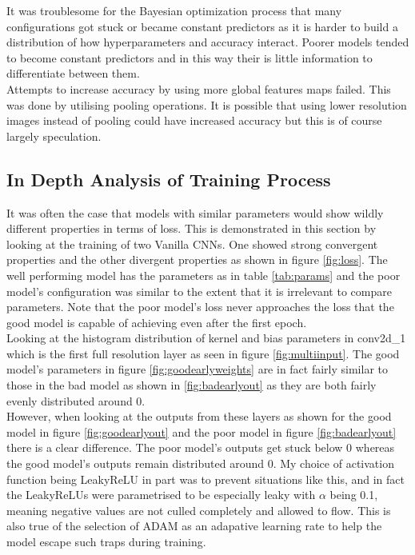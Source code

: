 \documentclass{article}
\begin{document}
{It was troublesome for the Bayesian optimization process that many configurations got stuck or became constant predictors as it is harder to build a distribution of how hyperparameters and accuracy interact. Poorer models tended to become constant predictors and in this way their is little information to differentiate between them. \\

Attempts to increase accuracy by using more global features maps failed. This was done by utilising pooling operations. It is possible that using lower resolution images instead of pooling could have increased accuracy but this is of course largely speculation. \\


\subsection{In Depth Analysis of Training Process}
It was often the case that models with similar parameters would show wildly different properties in terms of loss. This is demonstrated in this section by looking at the training of two Vanilla CNNs. One showed strong convergent properties and the other divergent properties as shown in figure \ref{fig:loss}. The well performing model has the parameters as in table \ref{tab:params} and the poor model's configuration was similar to the extent that it is irrelevant to compare parameters. Note that the poor model's loss never approaches the loss that the good model is capable of achieving even after the first epoch.\\

Looking at the histogram distribution of kernel and bias parameters in conv2d\_1 which is the first full resolution layer as seen in figure \ref{fig:multiinput}. The good model's parameters in figure \ref{fig:goodearlyweights} are in fact fairly similar to those in the bad model as shown in \ref{fig:badearlyout} as they are both fairly evenly distributed around 0. \\

However, when looking at the outputs from these layers as shown for the good model in figure \ref{fig:goodearlyout} and the poor model in figure \ref{fig:badearlyout} there is a clear difference. The poor model's outputs get stuck below 0 whereas the good model's outputs remain distributed around 0. My choice of activation function being LeakyReLU in part was to prevent situations like this, and in fact the LeakyReLUs were parametrised to be especially leaky with $\alpha$ being 0.1, meaning negative values are not culled completely and allowed to flow. This is also true of the selection of ADAM as an adapative learning rate to help the model escape such traps during training.\\

}
\end{document}
